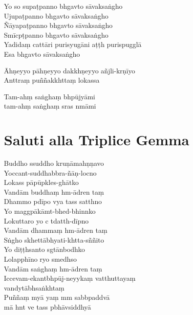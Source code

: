 \begin{leader}
\end{leader}

Yo so supaṭpanno bhgavto sāvaksaṅgho\\
Ujupaṭpanno bhgavto sāvaksaṅgho\\
Ñāyapaṭpanno bhgavto sāvaksaṅgho\\
Smīcpṭpanno bhgavto sāvaksaṅgho\\
Yadidaṃ cattāri purisyugāni aṭṭh purispugglā\\
Esa bhgavto sāvaksaṅgho

Āhṇeyyo pāhṇeyyo dakkhṇeyyo añjli-krṇīyo\\
Anttraṃ puññakkhttaṃ lokassa

Tam-ahṃ saṅghaṃ bhpūjyāmi\\
\vin tam-ahṃ saṅghaṃ sras nmāmi 

\chapter{Saluti alla Triplice Gemma}%

\begin{leader}
\end{leader}

Buddho ssuddho kruṇāmahṇṇavo\\
Yoccant-suddhabbra-ñāṇ-locno\\
Lokass pāpūpkles-ghātko\\
Vandām buddhaṃ hm-ādren taṃ\\
Dhammo pdīpo vya tass satthno\\
Yo maggpākāmt-bhed-bhinnko\\
Lokuttaro yo c tdatth-dīpno\\
Vandām dhammaṃ hm-ādren taṃ\\
Sṅgho skhettābhyati-khtta-sññito\\
Yo diṭṭhsanto sgtānbodhko\\
Lolapphīno ryo smedhso\\
Vandām saṅghaṃ hm-ādren taṃ\\
Iccevam-ekantbhpūj-neyykaṃ vatthuttayaṃ\\
vandytābhsaṅkhtaṃ\\
Puññaṃ myā yaṃ mm sabbpaddvā\\
\vin mā hnt ve tass pbhāvsiddhyā

